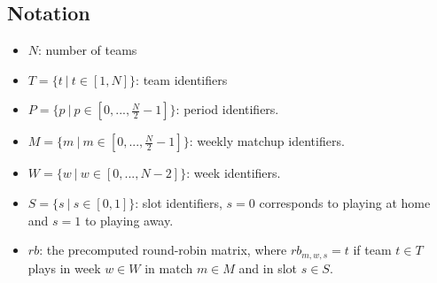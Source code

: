 \documentclass{article}
\begin{document}
\subsection{Notation}
\begin{itemize}
  \item $N$: number of teams
  \item $T=\{t\ |\ t \in [1, N]\}$: team identifiers
  \item $P=\{p\ |\ p \in [0, ..., \frac{N}{2} - 1]\}$: period identifiers.
  \item $M=\{m\ |\ m \in [0, ..., \frac{N}{2} - 1]\}$: weekly matchup identifiers.
  \item $W=\{w\ |\ w \in [0, ..., N-2]\}$: week identifiers.
  \item $S=\{s\ |\ s \in [0,1]\}$: slot identifiers, $s=0$ corresponds to playing at home and $s=1$ to playing away.
  \item $rb$: the precomputed round-robin matrix, where $rb_{m, w, s}=t$ if team $t \in T$ plays in week $w \in W$ in match $m \in M$ and in slot $s \in S$.
  
\end{itemize}













\end{document}
